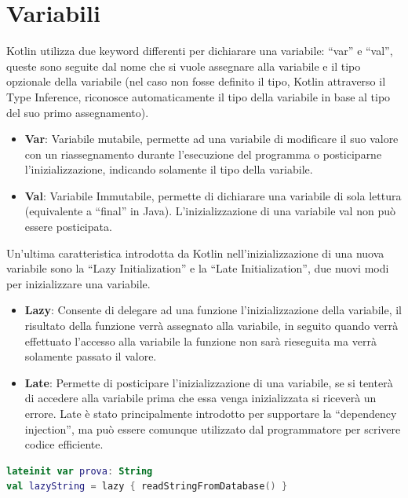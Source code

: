 \section{Variabili}
Kotlin utilizza due keyword differenti per dichiarare una variabile: ``var'' e ``val'', queste sono seguite dal nome che si vuole assegnare alla variabile e il tipo opzionale della variabile (nel caso non fosse definito il tipo, Kotlin attraverso il Type Inference, riconosce automaticamente il tipo della variabile in base al tipo del suo primo assegnamento).

\begin{itemize}                         %
\item \textbf{Var}: Variabile mutabile, permette ad una variabile di modificare il suo valore con un riassegnamento durante l'esecuzione del programma o posticiparne l'inizializzazione, indicando solamente il tipo della variabile.
\item \textbf{Val}: Variabile Immutabile, permette di dichiarare una variabile di sola lettura (equivalente a ``final'' in Java). L'inizializzazione di una variabile val non può essere posticipata.
\end{itemize}


Un'ultima caratteristica introdotta da Kotlin nell'inizializzazione di una nuova variabile sono la ``Lazy  Initialization'' e la ``Late Initialization'', due nuovi modi per inizializzare una variabile.
\begin{itemize}                         %
\item \textbf{Lazy}: Consente di delegare ad una funzione l'inizializzazione della variabile, il risultato della funzione verrà assegnato alla variabile, in seguito quando verrà effettuato l'accesso alla variabile la funzione non sarà rieseguita ma verrà solamente passato il valore.
\item \textbf{Late}: Permette di posticipare l'inizializzazione di una variabile, se si tenterà di accedere alla variabile prima che essa venga inizializzata si riceverà un errore. Late è  stato principalmente introdotto per supportare la ``dependency injection'', ma può essere comunque utilizzato dal programmatore per scrivere codice efficiente.
\end{itemize}

\begin{lstlisting}[language=Kotlin,caption={Esempio Late e Lazy Initialization in Kotlin}]
lateinit var prova: String
val lazyString = lazy { readStringFromDatabase() }
\end{lstlisting}


